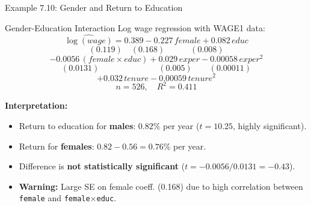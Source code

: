 \documentclass[aspectratio=169, 12pt]{beamer}
\begin{document}
\begin{frame}[shrink=28]{Example 7.10: Gender and Return to Education}

  \begin{examplebox}{Gender-Education Interaction}
    Log wage regression with WAGE1 data:
    \[
      \widehat{\log(\textit{wage})} = 0.389 - 0.227 \, \textit{female} + 0.082 \, \textit{educ}
    \]
    \[
      (0.119) \quad (0.168) \quad\quad\quad (0.008)
    \]
    \[
      - 0.0056 \, (\textit{female} \times \textit{educ}) + 0.029 \, \textit{exper} - 0.00058 \, \textit{exper}^2
    \]
    \[
      (0.0131) \quad\quad\quad\quad\quad\quad\quad (0.005) \quad\quad (0.00011)
    \]
    \[
      + 0.032 \, \textit{tenure} - 0.00059 \, \textit{tenure}^2
    \]
    \[
      n = 526, \quad R^2 = 0.411
    \]
  \end{examplebox}

  \medskip

  \textbf{Interpretation:}

  \begin{keybox}
    \begin{itemize}
      \item Return to education for \textbf{males}: $0.82\%$ per year ($t = 10.25$, highly significant).
      \item Return for \textbf{females}: $0.82 - 0.56 = 0.76\%$ per year.
      \item Difference is \textbf{not statistically significant} ($t = -0.0056 / 0.0131 = -0.43$).
      \item \textbf{Warning:} Large SE on female coeff. (0.168) due to high correlation between \texttt{female} and \texttt{female}×\texttt{educ}.
    \end{itemize}
  \end{keybox}

\end{frame}
\end{document}
